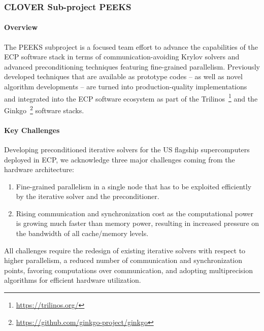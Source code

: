 \subsubsection{ CLOVER Sub-project PEEKS} \label{subsubsect:peeks}
\paragraph{Overview} 
The PEEKS subproject is a focused team effort to advance the capabilities of the
ECP software stack in terms of communication-avoiding Krylov solvers and
advanced preconditioning techniques featuring fine-grained parallelism.
Previously developed techniques that are available as prototype codes -- as
well as novel algorithm developments -- are turned into production-quality 
implementations and integrated into the ECP software ecosystem 
as part of the Trilinos~\footnote{\url{https://trilinos.org/}} and the  
Ginkgo~\footnote{\url{https://github.com/ginkgo-project/ginkgo}} software 
stacks. 


\paragraph{Key  Challenges}
Developing preconditioned iterative solvers for the US flagship supercomputers 
deployed in ECP, we acknowledge three major challenges coming from the hardware 
architecture:
\begin{enumerate}
\item 
Fine-grained parallelism in a single node that has to be exploited efficiently 
by the iterative solver and the preconditioner.
\item
Rising communication and synchronization cost as the
computational power is growing much faster than memory power, resulting in 
increased pressure on the bandwidth of all cache/memory levels.
\end{enumerate}

All challenges require the redesign of existing iterative solvers with respect 
to higher parallelism, %
a reduced number of 
communication and synchronization points, favoring computations over 
communication, and adopting multiprecision algorithms for efficient hardware 
utilization. 

